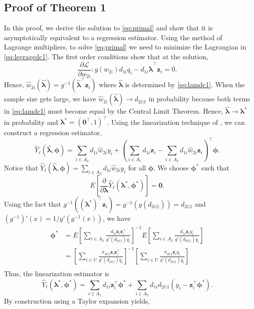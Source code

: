 \documentclass[12pt]{article}
\renewcommand{\bf}[1]{\mathbf{#1}}
\begin{document}
\subsection{Proof of Theorem 1}

In this proof, we derive the solution to \eqref{eq:primal} and show
that it is asymptotically equivalent to a regression estimator. Using the
method of Lagrange multipliers, to solve \eqref{eq:primal} we need to
minimize the Lagrangian in \eqref{eq:legragedc1}. 
The first order conditions show that at the solution,
$$
\frac{\partial \mathcal{L}}{\partial w_{2i}}: g(w_{2i}) d_{1i}q_i -
d_{1i} \hat{\bm \lambda}^\top \bf z_i = 0.
$$
Hence, $\hat w_{2i}(\hat{\bm \lambda}) = 
g^{-1}(\hat{\bm \lambda}^\top \bf z_i)$ where
$\hat{\bm \lambda}$ is determined by \eqref{eq:lamdc1}. When the
sample size gets large, we have $\hat w_{2i}(\hat{\bm \lambda}) \to
d_{2i|1}$ in probability because both terms in \eqref{eq:lamdc1} must
become equal by the Central Limit Theorem. Hence,
$\hat{\bm \lambda} \to \bm \lambda^*$ in probability and 
$\bm \lambda^* = (\bf 0^\top, 1)^\top$. 
Using the linearization technique of
\cite{randles1982asymptotic}, we can construct a regression estimator, 
$$
\hat Y_\ell(\hat{\bm \lambda}, \bm \phi) = 
\sum_{i \in A_2} d_{1i} \hat w_{2i} y_i + 
\left(\sum_{i \in A_1} d_{1i} \bm z_i  - \sum_{i \in A_2} d_{1i} 
\hat w_{2i} \bf z_i \right)^\top \bm \phi.
$$
Notice that $\hat Y_\ell(\hat{\bm \lambda}, \bm \phi) = \sum_{i \in A_2} d_{1i}
\hat w_{2i} y_i$ for all $\bm \phi$. We choose $\bm \phi^*$ such that
$$
E\left[\frac{\partial}{\partial \bm \lambda} \hat Y_\ell(\bm \lambda^*,
\bm \phi^*)\right]=\bf{0}.
$$
Using the fact that $g^{-1}((\bm \lambda^*)^\top \bf z_i) = g^{-1}(g(d_{2i|1})) = d_{2i|1}$
and $(g^{-1})'(x) = 1 / g'(g^{-1}(x))$, we have
\begin{align*}
  \bm \phi^*
  &= E\left[\sum_{i \in A_2} \frac{d_{1i}\bf z_i \bf z_i^\top }{g'(d_{2i|1})q_i}
  \right]^{-1}
  E\left[\sum_{i \in A_2} \frac{d_{1i}\bf z_i y_i}{g'(d_{2i|1})q_i}\right]\\
  &= \left[\sum_{i \in U} \frac{\pi_{2i|1} \bf z_i \bf z_i^\top }{g'(d_{2i|1})q_i}
  \right]^{-1}
  \left[\sum_{i \in U} \frac{\pi_{2i|1} \bf z_i y_i}{g'(d_{2i|1})q_i}\right]\\
\end{align*}
Thus, the linearization estimator is
$$\hat Y_\ell(\bm \lambda^*, \bm \phi^*) = 
\sum_{i \in A_1} d_{1i} \bf{z}_i^\top \bm \phi^* +
\sum_{i \in A_2} d_{1i} d_{2i|1} (y_i - \bf{z}_i^\top \bm \phi^*).$$
By construction using a Taylor expansion yields,
\end{document}
